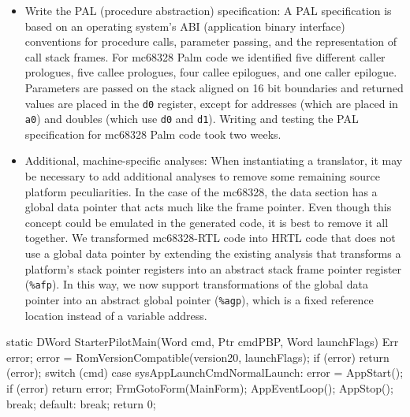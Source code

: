 \begin{itemize}
\item Write the PAL (procedure abstraction) specification:
    A PAL specification is based on an operating system's
    ABI (application binary interface) conventions for procedure calls,
    parameter passing, and the representation of call stack frames.  
	For mc68328 Palm code we identified five different caller 
	prologues, five callee prologues, four callee epilogues, 
    and one caller epilogue.
    Parameters are passed on the stack aligned on 16 bit boundaries 
	and returned values are placed in the \texttt{d0} register, 
	except for addresses (which are placed in \texttt{a0}) and doubles 
	(which use \texttt{d0} and \texttt{d1}).  
	Writing and testing the PAL specification for mc68328 Palm code
    took two weeks.  
	
\item Additional, machine-specific analyses: 
	When instantiating a translator,
	it may be necessary to add additional analyses 
	to remove some remaining source platform peculiarities.
	In the case of the mc68328, the data section has a 
	global data pointer that acts much like the frame pointer.
    Even though this concept could be emulated in the generated
    code, it is best to remove it all together.
    We transformed mc68328-RTL code into HRTL code that does not 
    use a global data pointer by extending the existing analysis that 
    transforms a platform's stack pointer registers into an 
    abstract stack frame pointer register (\texttt{\%afp}). 
    In this way, we now support transformations of the global data
    pointer into an abstract global pointer (\texttt{\%agp}), which
    is a fixed reference location instead of a variable address.   
\end{itemize}

\centerfigbegin
\begin{fnverbatim}
static DWord StarterPilotMain(Word cmd, Ptr cmdPBP, 
                              Word launchFlags)
{   Err error;
    error = RomVersionCompatible(version20,
                                 launchFlags);
    if (error) return (error);
    switch (cmd) {
       case sysAppLaunchCmdNormalLaunch:
           error = AppStart();
           if (error)
               return error;
           FrmGotoForm(MainForm);
           AppEventLoop();
           AppStop();
           break;
       default:
           break;
    }
    return 0;
}
\end{fnverbatim}

